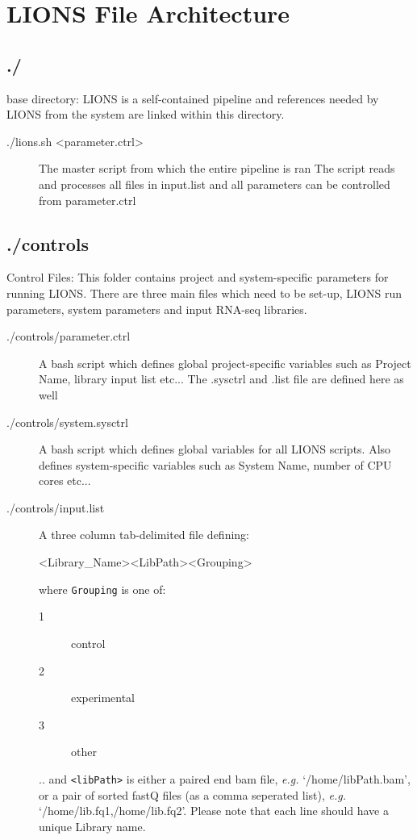 \documentclass[11pt]{scrartcl}
\newcommand{\arrows}[1]{\textless #1\textgreater}
\begin{document}
\clearpage
\section{LIONS File Architecture}

\subsection{./}
  base directory:  LIONS is a self-contained pipeline and 
  references needed by LIONS from the system are linked
  within this directory.

\begin{description}
\item[./lions.sh \arrows{parameter.ctrl}]
    The master script from which the entire pipeline is ran
    The script reads and processes all files in input.list
    and all parameters can be controlled from parameter.ctrl
\end{description}

\subsection{./controls}
\label{controls}
  Control Files: This folder contains project and system-specific
  parameters for running LIONS. There are three main files which
  need to be set-up, LIONS run parameters, system parameters and
  input RNA-seq libraries.
  
\begin{description}
\item[./controls/parameter.ctrl]
    A bash script which defines global project-specific 
    variables such as Project Name, library input list etc...
    The .sysctrl and .list file are defined here as well

\item[./controls/system.sysctrl]
    A bash script which defines global variables for all LIONS
    scripts. Also defines system-specific variables such as
    System Name, number of CPU cores etc...

\item[./controls/input.list]
    A three column tab-delimited file defining:

    \arrows{Library\_Name}\hspace{2em}\arrows{LibPath}\hspace{2em}\arrows{Grouping}

where \texttt{Grouping} is one of:
\begin{center}
    \begin{description}
    \item[1] control
    \item[2] experimental
    \item[3] other
    \end{description}
\end{center}
 .. and \texttt{<libPath>} is either a paired end bam file, \textit{e.g.} `/home/libPath.bam', or a pair of sorted fastQ files (as a comma seperated list), \textit{e.g.} `/home/lib.fq1,/home/lib.fq2'. Please note that each line should have a unique Library name.
\end{description}
    
\end{document}

